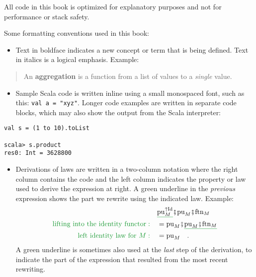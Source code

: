 All code in this book is optimized for explanatory purposes and not
for performance or stack safety.

Some formatting conventions used in this book:
\begin{itemize}
\item Text in boldface indicates a new concept or term that is being defined.
Text in italics is a logical emphasis. Example:
\end{itemize}
\begin{quotation}
An \textbf{aggregation} is a function from a list
of values to a \emph{single} value.
\end{quotation}
\begin{itemize}
\item Sample Scala code is written inline using a small monospaced font,
such as this: \lstinline!val a = "xyz"!. Longer code examples are
written in separate code blocks, which may also show the output from
the Scala interpreter:
\end{itemize}
\begin{lstlisting}
val s = (1 to 10).toList

scala> s.product
res0: Int = 3628800 
\end{lstlisting}

\begin{itemize}
\item Derivations of laws are written in a two-column notation where the
right column contains the code and the left column indicates the property
or law used to derive the expression at right. A green underline in
the \emph{previous} expression shows the part we rewrite using the
indicated law. Example: 
\begin{align*}
 & \gunderline{\text{pu}_{M}^{\uparrow\text{Id}}}\bef\text{pu}_{M}\bef\text{ftn}_{M}\\
{\color{greenunder}\text{lifting into the identity functor}:}\quad & =\text{pu}_{M}\bef\gunderline{\text{pu}_{M}\bef\text{ftn}_{M}}\\
{\color{greenunder}\text{left identity law for }M:}\quad & =\text{pu}_{M}\quad.
\end{align*}
A green underline is sometimes also used at the \emph{last} step of
the derivation, to indicate the part of the expression that resulted
from the most recent rewriting.
\end{itemize}

